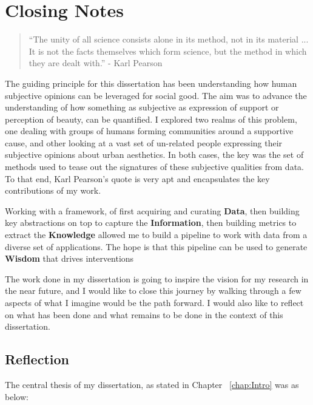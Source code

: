 \chapter{ Closing Notes }


\graphicspath{{Chapter6/plots/}}

\begin{quote}
    ``The unity of all science consists alone in its method, not in its material ... It is not the facts themselves which form science, but the method in which they are dealt with.'' - Karl Pearson
\end{quote}


The guiding principle for this dissertation has been understanding how human subjective opinions can be leveraged for social good. The aim was to advance the understanding of how something as subjective as expression of support or perception of beauty, can be quantified. 
I explored two realms of this problem, one dealing with groups of humans forming communities around a supportive cause, and other looking at a vast set of un-related people expressing their subjective opinions about urban aesthetics. In both cases, the key was the set of methods used to tease out the signatures of these subjective qualities from data. To that end, Karl Pearson's quote is very apt and encapsulates the key contributions of my work.

Working with a framework, of first acquiring and curating \textbf{Data}, then building key abstractions on top to capture the \textbf{Information}, then building metrics to extract the \textbf{Knowledge} allowed me to build a pipeline to work with data from a diverse set of applications. The hope is that this pipeline can be used to generate \textbf{Wisdom} that drives interventions

The work done in my dissertation is going to inspire the vision for my research in the near future, and I would like to close this journey by walking through a few aspects of what I imagine would be the path forward. I would also like to reflect on what has been done and what remains to be done in the context of this dissertation.

\section{Reflection}
The central thesis of my dissertation, as stated in Chapter ~\ref{chap:Intro} was as below: 

